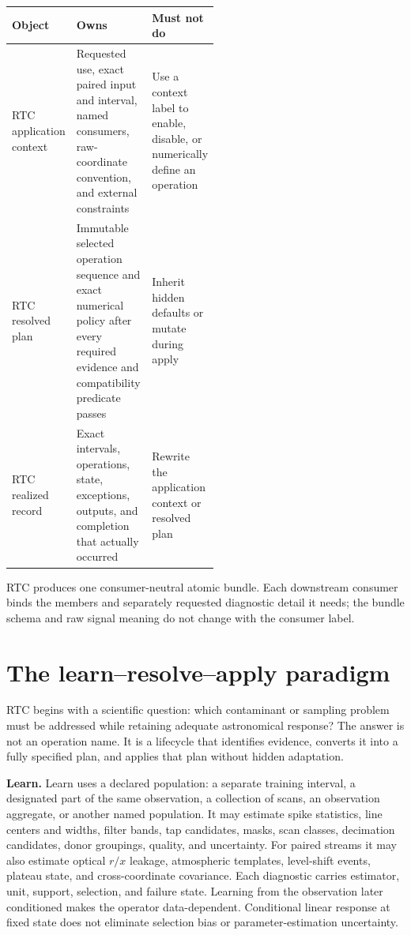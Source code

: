 \documentclass[10pt]{article}
\renewcommand{\arraystretch}{1.13}
\begin{document}
\begingroup
\footnotesize
\renewcommand{\arraystretch}{1.08}
\begin{tabularx}{\linewidth}{@{}p{0.22\linewidth}Xp{0.30\linewidth}@{}}
\toprule
Object & Owns & Must not do \\
\midrule
RTC application context & Requested use, exact paired input and interval,
named consumers, raw-coordinate convention, and external constraints & Use a
context label to enable, disable, or numerically define an operation \\
RTC resolved plan & Immutable selected operation sequence and exact numerical
policy after every required evidence and compatibility predicate passes &
Inherit hidden defaults or mutate during apply \\
RTC realized record & Exact intervals, operations, state, exceptions, outputs,
and completion that actually occurred & Rewrite the application context or
resolved plan \\
\bottomrule
\end{tabularx}
\endgroup

RTC produces one consumer-neutral atomic bundle.  Each downstream consumer
binds the members and separately requested diagnostic detail it needs; the
bundle schema and raw signal meaning do not change with the consumer label.

\section{The learn--resolve--apply paradigm}
\label{sec:rat-lifecycle}
RTC begins with a scientific question: which contaminant or sampling problem
must be addressed while retaining adequate astronomical response? The answer
is not an operation name. It is a lifecycle that identifies evidence,
converts it into a fully specified plan, and applies that plan without hidden
adaptation.

\textbf{Learn.} Learn uses a declared population: a separate training
interval, a designated part of the same observation, a collection of scans,
an observation aggregate, or another named population. It may estimate spike
statistics, line centers and widths, filter bands, tap candidates, masks, scan
classes, decimation candidates, donor groupings, quality, and uncertainty.
For paired streams it may also estimate optical $r/x$ leakage, atmospheric
templates, level-shift events, plateau state, and cross-coordinate covariance.
Each diagnostic carries estimator, unit, support, selection, and failure
state. Learning from the observation later conditioned makes the operator
data-dependent. Conditional linear response at fixed state does not eliminate
selection bias or parameter-estimation uncertainty.
\end{document}
